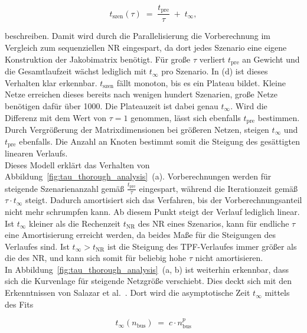 \begin{equation}
	t_\mathrm{szen}(\tau) \;=\; \frac{t_\mathrm{pre}}{\tau} \;+\; t_\infty ,
	\label{eq:batch_amort}
\end{equation}

beschreiben.
Damit wird durch die Parallelisierung die Vorberechnung im Vergleich zum sequenziellen NR eingespart, da dort jedes Szenario eine eigene Konstruktion der Jakobimatrix benötigt.
Für große $\tau$ verliert $t_\mathrm{pre}$ an Gewicht und die Gesamtlaufzeit wächst lediglich mit $t_\infty$ pro Szenario.
In (d) ist dieses Verhalten klar erkennbar.
$t_\mathrm{szen}$ fällt monoton, bis es ein Plateau bildet. 
Kleine Netze erreichen dieses bereits nach wenigen hundert Szenarien, große Netze benötigen dafür über 1000.
Die Plateauzeit ist dabei genau $t_\infty$. 
Wird die Differenz mit dem Wert von $\tau=1$ genommen, lässt sich ebenfalls $t_\mathrm{pre}$ bestimmen.
Durch Vergrößerung der Matrixdimensionen bei größeren Netzen, steigen $t_\infty$ und $t_\mathrm{pre}$ ebenfalls.
Die Anzahl an Knoten bestimmt somit die Steigung des gesättigten linearen Verlaufs.
\\

Dieses Modell erklärt das Verhalten von Abbildung~\ref{fig:tau_thorough_analysis}~(a). 
Vorberechnungen werden für steigende Szenarienanzahl gemäß $\frac{t_\mathrm{pre}}{\tau}$ eingespart, während die Iterationzeit gemäß $\tau \cdot t_\infty$ steigt.
Dadurch amortisiert sich das Verfahren, bis der Vorberechnungsanteil nicht mehr schrumpfen kann. 
Ab diesem Punkt steigt der Verlauf lediglich linear.\\

Ist $t_\infty$ kleiner als die Rechenzeit $t_\mathrm{NR}$ des NR eines Szenarios, kann für endliche $\tau$ eine Amortisierung erreicht werden, da beides Maße für die Steigungen des Verlaufes sind.
Ist $t_\infty > t_\mathrm{NR}$ ist die Steigung des TPF-Verlaufes immer größer als die des NR, und kann sich somit für beliebig hohe $\tau$ nicht amortisieren.
\\

In Abbildung~\ref{fig:tau_thorough_analysis}~(a, b) ist weiterhin erkennbar, dass sich die Kurvenlage für steigende Netzgröße verschiebt.
Dies deckt sich mit den Erkenntnissen von Salazar et al.~\cite{Salazar2024}. 
Dort wird die asymptotische Zeit $t_\infty$ mittels des Fits

\begin{equation}
	t_\infty(n_\mathrm{bus}) \;=\; c \cdot n_\mathrm{bus}^p
	\label{eq:fit}
\end{equation}

